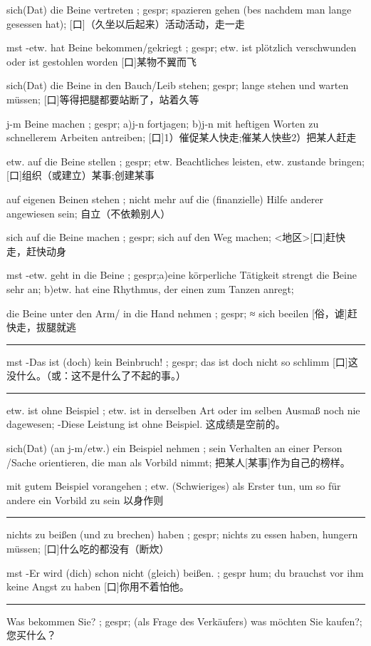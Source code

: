 sich(Dat) die Beine vertreten ; gespr; spazieren gehen (bes nachdem man lange gesessen hat); 
[口]（久坐以后起来）活动活动，走一走

mst -etw. hat Beine bekommen/gekriegt ; gespr; etw. ist plötzlich verschwunden oder ist gestohlen worden
[口]某物不翼而飞

sich(Dat) die Beine in den Bauch/Leib stehen; gespr; lange stehen und warten müssen;
[口]等得把腿都要站断了，站着久等

j-m Beine machen ; gespr; a)j-n fortjagen; b)j-n mit heftigen Worten zu schnellerem Arbeiten antreiben;
[口]1）催促某人快走;催某人快些2）把某人赶走

etw. auf die Beine stellen ; gespr; etw. Beachtliches leisten, etw. zustande bringen;
[口]组织（或建立）某事;创建某事

auf eigenen Beinen stehen ; nicht mehr auf die (finanzielle) Hilfe anderer angewiesen sein;
自立（不依赖别人）

sich auf die Beine machen ; gespr; sich auf den Weg machen;
\textless 地区\textgreater [口]赶快走，赶快动身

mst -etw. geht in die Beine ; gespr;a)eine körperliche Tätigkeit strengt die Beine sehr an; b)etw. hat eine Rhythmus, der einen zum Tanzen anregt;


die Beine unter den Arm/ in die Hand nehmen ; gespr; ≈ sich beeilen
[俗，谑]赶快走，拔腿就逃

\noindent\rule{\textwidth}{1pt} 
mst -Das ist (doch) kein Beinbruch! ; gespr; das ist doch nicht so schlimm
[口]这没什么。（或：这不是什么了不起的事。）

\noindent\rule{\textwidth}{1pt} 
etw. ist ohne Beispiel ; etw. ist in derselben Art oder im selben Ausmaß noch nie dagewesen;
-Diese Leistung ist ohne Beispiel. 这成绩是空前的。

sich(Dat) (an j-m/etw.) ein Beispiel nehmen ; sein Verhalten an einer Person /Sache orientieren, die man als Vorbild nimmt;
把某人[某事]作为自己的榜样。

mit gutem Beispiel vorangehen ; etw. (Schwieriges) als Erster tun, um so für andere ein Vorbild zu sein
以身作则

\noindent\rule{\textwidth}{1pt} 
nichts zu beißen (und zu brechen) haben ; gespr; nichts zu essen haben, hungern müssen;
[口]什么吃的都没有（断炊）

mst -Er wird (dich) schon nicht (gleich) beißen. ; gespr hum; du brauchst vor ihm keine Angst zu haben
[口]你用不着怕他。

\noindent\rule{\textwidth}{1pt} 
Was bekommen Sie? ; gespr; (als Frage des Verkäufers) was möchten Sie kaufen?;
您买什么？

